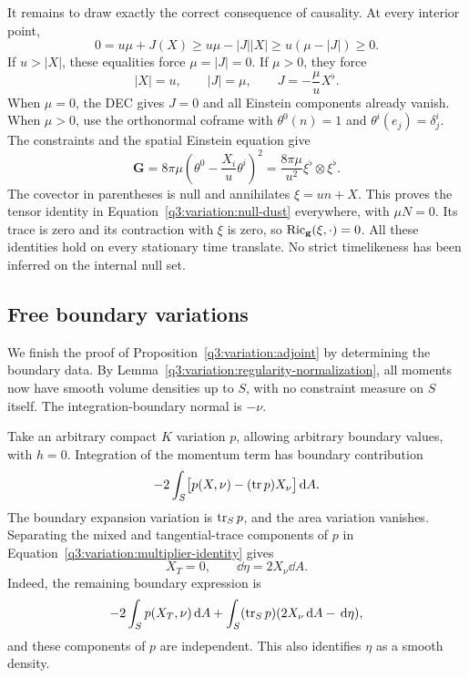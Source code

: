 It remains to draw exactly the correct consequence of causality.
At every interior point,
\begin{equation}
 0=u\mu+J(X)
    \ge u\mu-|J||X|
    \ge u(\mu-|J|)\ge0.
 \label{q3:variation:causal-equalities}
\end{equation}
If $u>|X|$, these equalities force $\mu=|J|=0$.
If $\mu>0$, they force
\begin{equation}
 |X|=u,\qquad |J|=\mu,\qquad
 J=-\frac\mu u X^\flat.
 \label{q3:variation:dust-alignment}
\end{equation}
When $\mu=0$, the DEC gives $J=0$ and all Einstein components
already vanish.  When $\mu>0$, use the orthonormal coframe with
$\theta^0(n)=1$ and $\theta^i(e_j)=\delta^i_j$.  The constraints
and the spatial Einstein equation give
\[
 \mathbf G
  =8\pi\mu\left(\theta^0-\frac{X_i}{u}\theta^i\right)^2
  =\frac{8\pi\mu}{u^2}\xi^\flat\otimes\xi^\flat.
\]
The covector in parentheses is null and annihilates
$\xi=un+X$.  This proves the tensor identity in
Equation~\eqref{q3:variation:null-dust} everywhere, with
$\mu N=0$.  Its trace is zero and its contraction with $\xi$ is
zero, so $\operatorname{Ric}_{\mathbf g}(\xi,\cdot)=0$.  All these identities
hold on every stationary time translate.  No strict timelikeness
has been inferred on the internal null set.

\subsection{Free boundary variations}
\label{q3:variation:boundary-subsection}

We finish the proof of Proposition~\ref{q3:variation:adjoint} by
determining the boundary data.  By
Lemma~\ref{q3:variation:regularity-normalization}, all moments now
have smooth volume densities up to $S$, with no constraint measure
on $S$ itself.  The integration-boundary normal is $-\nu$.

Take an arbitrary compact $K$ variation $p$, allowing arbitrary
boundary values, with $h=0$.  Integration of the momentum term has
boundary contribution
\[
 -2\int_S\bigl[p(X,\nu)-(\operatorname{tr} p)X_\nu\bigr]\,\mathrm d A.
\]
The boundary expansion variation is $\operatorname{tr}_Sp$, and the area variation
vanishes.  Separating the mixed and tangential-trace components of
$p$ in Equation~\eqref{q3:variation:multiplier-identity} gives
\begin{equation}
 X_T=0,\qquad \dd\eta=2X_\nu\dd A.
 \label{q3:variation:eta-density}
\end{equation}
Indeed, the remaining boundary expression is
\[
 -2\int_S p(X_T,\nu)\,\mathrm d A
      +\int_S(\operatorname{tr}_Sp)(2X_\nu\,\mathrm d A-\,\mathrm d\eta),
\]
and these components of $p$ are independent.  This also identifies
$\eta$ as a smooth density.

